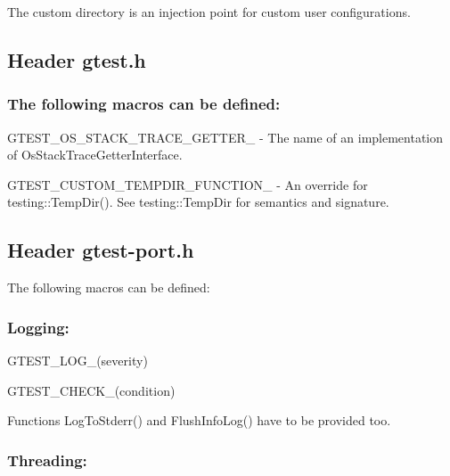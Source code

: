 The custom directory is an injection point for custom user configurations.

\subsection*{Header {\ttfamily gtest.\+h}}

\subsubsection*{The following macros can be defined\+:}


\begin{DoxyItemize}
\item {\ttfamily G\+T\+E\+S\+T\+\_\+\+O\+S\+\_\+\+S\+T\+A\+C\+K\+\_\+\+T\+R\+A\+C\+E\+\_\+\+G\+E\+T\+T\+E\+R\+\_\+} -\/ The name of an implementation of {\ttfamily Os\+Stack\+Trace\+Getter\+Interface}.
\item {\ttfamily G\+T\+E\+S\+T\+\_\+\+C\+U\+S\+T\+O\+M\+\_\+\+T\+E\+M\+P\+D\+I\+R\+\_\+\+F\+U\+N\+C\+T\+I\+O\+N\+\_\+} -\/ An override for {\ttfamily testing\+::\+Temp\+Dir()}. See {\ttfamily testing\+::\+Temp\+Dir} for semantics and signature.
\end{DoxyItemize}

\subsection*{Header {\ttfamily gtest-\/port.\+h}}

The following macros can be defined\+:

\subsubsection*{Logging\+:}


\begin{DoxyItemize}
\item {\ttfamily G\+T\+E\+S\+T\+\_\+\+L\+O\+G\+\_\+(severity)}
\item {\ttfamily G\+T\+E\+S\+T\+\_\+\+C\+H\+E\+C\+K\+\_\+(condition)}
\item Functions {\ttfamily Log\+To\+Stderr()} and {\ttfamily Flush\+Info\+Log()} have to be provided too.
\end{DoxyItemize}

\subsubsection*{Threading\+:}


